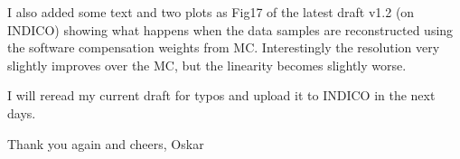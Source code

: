 \documentclass[twoside,a4paper,12pt]{article}
\begin{document}
I also added some text and two plots as Fig17 of the latest draft v1.2 (on INDICO) showing what happens when the data samples are reconstructed using the software compensation weights from MC. Interestingly the resolution very slightly improves over the MC, but the linearity becomes slightly worse.

I will reread my current draft for typos and upload it to INDICO in the next days.

Thank you again and cheers,
Oskar
\end{document}
